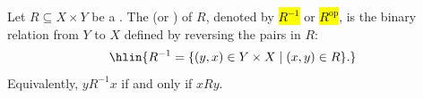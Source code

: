 \begin{definition} \label{definition:inverse_of_a_binary_relation}
    Let $R \subseteq X \times Y$ be a .
    The  (or ) of $R$, denoted by \hl{$R^{-1}$} or \hl{$R^{\operatorname{op}}$}, is the binary relation from $Y$ to $X$ defined by reversing the pairs in $R$:
    $$ \hlin{ R^{-1} = \{ (y, x) \in Y \times X \mid (x, y) \in R \}. } $$
    Equivalently, $y R^{-1} x$ if and only if $x R y$.
\end{definition}